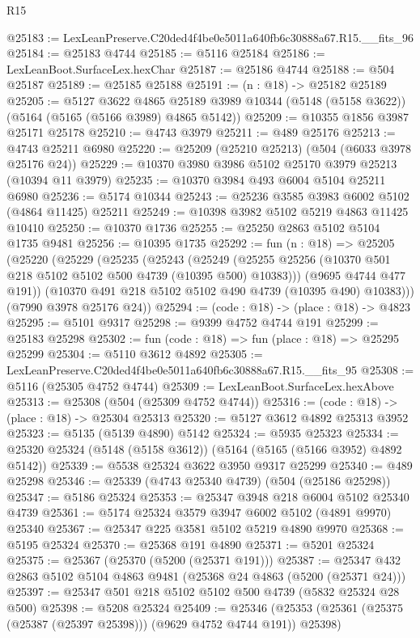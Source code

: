 \begin{lexlean}{R15}
\begin{coremodule}
{{{{{{{{{{{@25183 := LexLeanPreserve.C20ded4f4be0e5011a640fb6c30888a67.R15.__fits_96
@25184 := @25183 @4744
@25185 := @5116 @25184
@25186 := LexLeanBoot.SurfaceLex.hexChar
@25187 := @25186 @4744
@25188 := @504 @25187
@25189 := @25185 @25188
@25191 := (n : @18) -> @25182 @25189
@25205 := @5127
    @3622
    @4865
    @25189
    @3989
    @10344
    (@5148 (@5158 @3622))
    (@5164 (@5165 (@5166 @3989) @4865 @5142))
@25209 := @10355 @1856 @3987 @25171 @25178
@25210 := @4743 @3979
@25211 := @489 @25176
@25213 := @4743 @25211 @6980
@25220 := @25209 (@25210 @25213) (@504 (@6033 @3978 @25176 @24))
@25229 := @10370 @3980 @3986 @5102 @25170 @3979 @25213 (@10394 @11 @3979)
@25235 := @10370 @3984 @493 @6004 @5104 @25211 @6980
@25236 := @5174 @10344
@25243 := @25236 @3585 @3983 @6002 @5102 (@4864 @11425) @25211
@25249 := @10398 @3982 @5102 @5219 @4863 @11425 @10410
@25250 := @10370 @1736
@25255 := @25250 @2863 @5102 @5104 @1735 @9481
@25256 := @10395 @1735
@25292 := fun (n : @18) =>
  @25205
    (@25220
      (@25229
        (@25235
          (@25243
            (@25249 (@25255 @25256 (@10370 @501 @218 @5102 @5102 @500 @4739 (@10395 @500) @10383)))
            (@9695 @4744 @477 @191))
          (@10370 @491 @218 @5102 @5102 @490 @4739 (@10395 @490) @10383)))
      (@7990 @3978 @25176 @24))
@25294 := (code : @18) -> (place : @18) -> @4823
@25295 := @5101 @9317
@25298 := @9399 @4752 @4744 @191
@25299 := @25183 @25298
@25302 := fun (code : @18) => fun (place : @18) => @25295 @25299
@25304 := @5110 @3612 @4892
@25305 := LexLeanPreserve.C20ded4f4be0e5011a640fb6c30888a67.R15.__fits_95
@25308 := @5116 (@25305 @4752 @4744)
@25309 := LexLeanBoot.SurfaceLex.hexAbove
@25313 := @25308 (@504 (@25309 @4752 @4744))
@25316 := (code : @18) -> (place : @18) -> @25304 @25313
@25320 := @5127 @3612 @4892 @25313 @3952
@25323 := @5135 (@5139 @4890) @5142
@25324 := @5935 @25323
@25334 := @25320 @25324 (@5148 (@5158 @3612)) (@5164 (@5165 (@5166 @3952) @4892 @5142))
@25339 := @5538 @25324 @3622 @3950 @9317 @25299
@25340 := @489 @25298
@25346 := @25339 (@4743 @25340 @4739) (@504 (@25186 @25298))
@25347 := @5186 @25324
@25353 := @25347 @3948 @218 @6004 @5102 @25340 @4739
@25361 := @5174 @25324 @3579 @3947 @6002 @5102 (@4891 @9970) @25340
@25367 := @25347 @225 @3581 @5102 @5219 @4890 @9970
@25368 := @5195 @25324
@25370 := @25368 @191 @4890
@25371 := @5201 @25324
@25375 := @25367 (@25370 (@5200 (@25371 @191)))
@25387 := @25347 @432 @2863 @5102 @5104 @4863 @9481 (@25368 @24 @4863 (@5200 (@25371 @24)))
@25397 := @25347 @501 @218 @5102 @5102 @500 @4739 (@5832 @25324 @28 @500)
@25398 := @5208 @25324
@25409 := @25346 (@25353 (@25361 (@25375 (@25387 (@25397 @25398))) (@9629 @4752 @4744 @191)) @25398)
}}}}}}}}}}}
\end{coremodule}
\end{lexlean}
